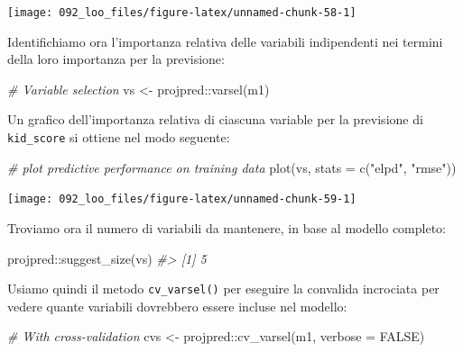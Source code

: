 \documentclass[
  10pt,
  italian,
  a4paper,
  extrafontsizes,onecolumn,openright
  ]{memoir}
\newenvironment{Shaded}{\begin{snugshade}}{\end{snugshade}}
\newcommand{\AttributeTok}[1]{\textcolor[rgb]{0.77,0.63,0.00}{#1}}
\newcommand{\CommentTok}[1]{\textcolor[rgb]{0.56,0.35,0.01}{\textit{#1}}}
\newcommand{\ConstantTok}[1]{\textcolor[rgb]{0.00,0.00,0.00}{#1}}
\newcommand{\FunctionTok}[1]{\textcolor[rgb]{0.00,0.00,0.00}{#1}}
\newcommand{\NormalTok}[1]{#1}
\newcommand{\OtherTok}[1]{\textcolor[rgb]{0.56,0.35,0.01}{#1}}
\newcommand{\SpecialCharTok}[1]{\textcolor[rgb]{0.00,0.00,0.00}{#1}}
\newcommand{\StringTok}[1]{\textcolor[rgb]{0.31,0.60,0.02}{#1}}
\newlength{\rf}
\theoremstyle{definition}
\theoremstyle{definition}
\theoremstyle{definition}
\theoremstyle{definition}
\theoremstyle{remark}
\begin{document}
\begin{center}\texttt{[image: 092\_loo\_files/figure-latex/unnamed-chunk-58-1]} \end{center}

\noindent
Identifichiamo ora l'importanza relativa delle variabili indipendenti nei termini della loro importanza per la previsione:

\begin{Shaded}
\begin{Highlighting}[]
\CommentTok{\# Variable selection}
\NormalTok{vs }\OtherTok{\textless{}{-}}\NormalTok{ projpred}\SpecialCharTok{::}\FunctionTok{varsel}\NormalTok{(m1)}
\end{Highlighting}
\end{Shaded}

\noindent
Un grafico dell'importanza relativa di ciascuna variable per la previsione di \texttt{kid\_score} si ottiene nel modo seguente:

\begin{Shaded}
\begin{Highlighting}[]
\CommentTok{\# plot predictive performance on training data}
\FunctionTok{plot}\NormalTok{(vs, }\AttributeTok{stats =} \FunctionTok{c}\NormalTok{(}\StringTok{"elpd"}\NormalTok{, }\StringTok{"rmse"}\NormalTok{))}
\end{Highlighting}
\end{Shaded}

\begin{center}\texttt{[image: 092\_loo\_files/figure-latex/unnamed-chunk-59-1]} \end{center}

\noindent
Troviamo ora il numero di variabili da mantenere, in base al modello completo:

\begin{Shaded}
\begin{Highlighting}[]
\NormalTok{projpred}\SpecialCharTok{::}\FunctionTok{suggest\_size}\NormalTok{(vs)}
\CommentTok{\#\textgreater{} [1] 5}
\end{Highlighting}
\end{Shaded}

\noindent
Usiamo quindi il metodo \texttt{cv\_varsel()} per eseguire la convalida incrociata per vedere quante variabili dovrebbero essere incluse nel modello:

\begin{Shaded}
\begin{Highlighting}[]
\CommentTok{\# With cross{-}validation}
\NormalTok{cvs }\OtherTok{\textless{}{-}}\NormalTok{ projpred}\SpecialCharTok{::}\FunctionTok{cv\_varsel}\NormalTok{(m1, }\AttributeTok{verbose =} \ConstantTok{FALSE}\NormalTok{)}
\end{Highlighting}
\end{Shaded}
\end{document}
